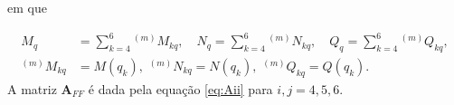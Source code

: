 em que

\begin{align}
	M_{q}
	 & =\sum_{k=4}^6 {^{(m)}M_{kq}},\quad N_{q}=\sum_{k=4}^6 {^{(m)}N_{kq}},\quad Q_{q}=\sum_{k=4}^6  {^{(m)}Q_{kq}}, \\   \nonumber
	                                                                                                                       ^{(m)}M_{kq}
	 & = M(q_k),\,\, ^{(m)}N_{kq} = N(q_k),\,\, ^{(m)}Q_{kq} = Q(q_k).
\end{align}
A matriz $\mathbf{A}_{FF}$ é dada pela equação \ref{eq:Aii} para $i,j=4,5,6$.
